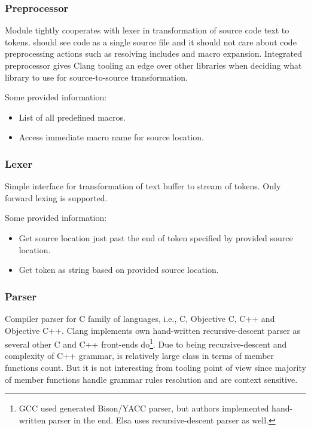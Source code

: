 \subsubsection{Preprocessor}
Module tightly cooperates with lexer in transformation of source code text to tokens.  should see code as a single source file and it should not care about code preprocessing actions such as resolving includes and macro expansion. Integrated preprocessor gives Clang tooling an edge over other libraries when deciding what library to use for source-to-source transformation.

Some provided information:

\begin{itemize}
\item List of all predefined macros.
\item Access immediate macro name for source location.
\end{itemize}

\subsubsection{Lexer}
Simple interface for transformation of text buffer to stream of tokens. Only forward lexing is supported.

Some provided information:

\begin{itemize}
\item Get source location just past the end of token specified by provided source location.
\item Get token as string based on provided source location.
\end{itemize}

\subsubsection{Parser}
Compiler parser for C family of languages, i.e., C, Objective C, C++ and Objective C++. Clang implements own hand-written recursive-descent parser as several other C and C++ front-ends do\footnote{GCC used generated Bison/YACC parser, but authors implemented hand-written parser in the end. Elsa uses recursive-descent parser as well.}. Due to being recursive-descent and complexity of C++ grammar,  is relatively large class in terms of member functions count. But it is not interesting from tooling point of view since majority of member functions handle grammar rules resolution and are context sensitive.

